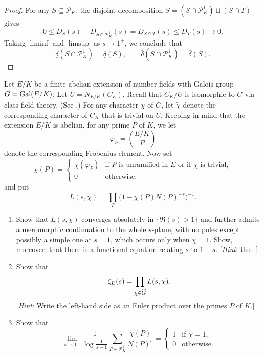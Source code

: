 \begin{proof}
  For any $S \subseteq \mathscr{P}_K$, the disjoint decomposition
  $S = (S \cap \mathscr{P}_K^1) \sqcup (S \cap T)$ gives
  \[
    0 \le D_S(s) - D_{S \cap \mathscr{P}_K^1}(s)
    = D_{S \cap T}(s) \le D_T(s) \longrightarrow 0.
  \]
  Taking $\liminf$ and $\limsup$ as $s \to 1^+$, we conclude that
  \[
    \underline{\delta}(S \cap \mathscr{P}_K^1) = \underline{\delta}(S),
    \qquad
    \overline{\delta}(S \cap \mathscr{P}_K^1) = \overline{\delta}(S).
  \]
\end{proof}

\begin{exercise}[17]
  \label{ex:ch7-17}
  Let $E/K$ be a finite abelian extension of number fields with Galois group
  $G = \operatorname{Gal}(E/K)$. Let $U = N_{E/K}(C_E)$. Recall that $C_K/U$ is isomorphic
  to $G$ via class field theory. (See .) For any character
  $\chi$ of $G$, let $\widetilde{\chi}$ denote the corresponding character of
  $C_K$ that is trivial on $U$. Keeping in mind that the extension $E/K$ is
  abelian, for any prime $P$ of $K$, we let
  \[
    \varphi_P = \left(\frac{E/K}{P}\right)
  \]
  denote the corresponding Frobenius element. Now set
  \[
    \chi(P) =
    \begin{cases}
      \chi(\varphi_P) & \text{if $P$ is unramified in $E$ or if $\chi$ is
      trivial}, \\
      0 & \text{otherwise},
    \end{cases}
  \]
  and put
  \[
    L(s, \chi) = \prod_P \bigl(1 - \chi(P) N(P)^{-s}\bigr)^{-1}.
  \]
  \begin{enumerate}[label=(\alph*)]
    \item Show that $L(s, \chi)$ converges absolutely in $\{\Re(s) > 1\}$ and
      further admits a meromorphic continuation to the whole $s$-plane, with
      no poles except possibly a simple one at $s = 1$, which occurs only
      when $\chi = 1$. Show, moreover, that there is a functional equation
      relating $s$ to $1 - s$. [\emph{Hint}: Use
      .]
    \item Show that
      \[
        \zeta_E(s) = \prod_{\chi \in \widehat{G}} L(s, \chi).
      \]
      [\emph{Hint}: Write the left-hand side as an Euler product over the
      primes $P$ of $K$.]
    \item Show that
      \[
        \lim_{s \to 1^+} \frac{1}{\log\frac{1}{s-1}}
        \sum_{P \in \mathscr{P}_K^1} \frac{\chi(P)}{N(P)^s}
        =
        \begin{cases}
          1 & \text{if } \chi = 1, \\
          0 & \text{otherwise.}
        \end{cases}
      \]
  \end{enumerate}
\end{exercise}

